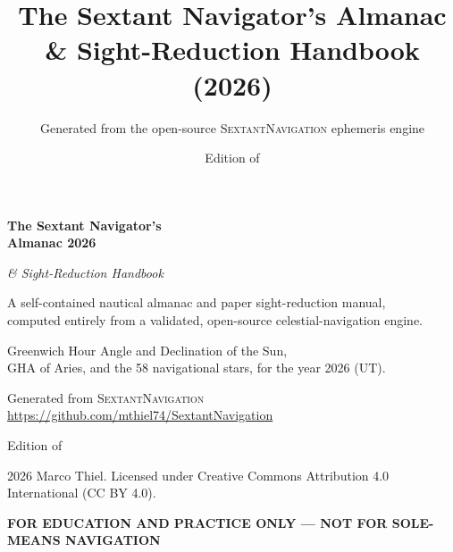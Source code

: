 \documentclass[10pt,letterpaper,twoside]{book}
\title{The Sextant Navigator's Almanac \& Sight-Reduction Handbook (2026)}
\author{Generated from the open-source \textsc{SextantNavigation} ephemeris engine}
\date{Edition of \genDate}
\begin{document}
\frontmatter

\begin{titlepage}
\centering
\vspace*{2.2cm}
{\Huge\bfseries The Sextant Navigator's\\[4pt] Almanac 2026\par}
\vspace{6pt}
{\Large\itshape \& Sight-Reduction Handbook\par}
\vspace{1.4cm}
{\large A self-contained nautical almanac and paper sight-reduction manual,\\
computed entirely from a validated, open-source celestial-navigation engine.\par}
\vfill
{\large Greenwich Hour Angle and Declination of the Sun,\\
GHA of Aries, and the 58 navigational stars, for the year 2026 (UT).\par}
\vspace{1.2cm}
{\normalsize Generated from \textsc{SextantNavigation}\\
\url{https://github.com/mthiel74/SextantNavigation}\par}
\vspace{0.6cm}
{\small Edition of \genDate\par}
\vspace{0.4cm}
{\footnotesize \textcopyright{} 2026 Marco Thiel. Licensed under Creative Commons
Attribution 4.0 International (CC BY 4.0).\par}
\vfill
{\footnotesize\bfseries FOR EDUCATION AND PRACTICE ONLY --- NOT FOR SOLE-MEANS NAVIGATION\par}
\end{titlepage}
\end{document}
